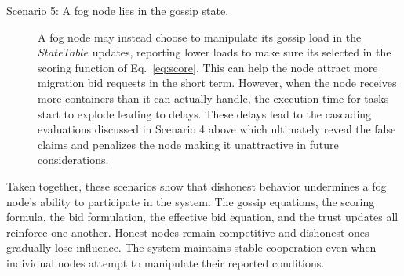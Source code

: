 \documentclass{article}
\begin{document}
\begin{description}
\item[Scenario 5: A fog node lies in the gossip state.]
A fog node may instead choose to manipulate its gossip load in the $StateTable$ updates, reporting lower loads to make sure its selected in the scoring function of Eq.~\ref{eq:score}. This can help the node attract more migration bid requests in the short term. However, when the node receives more containers than it can actually handle, the execution time for tasks start to explode leading to delays. These delays lead to the cascading evaluations discussed in Scenario 4 above which ultimately reveal the false claims and penalizes the node making it unattractive in future considerations. 





\end{description}

Taken together, these scenarios show that dishonest behavior undermines a fog node’s ability to participate in the system. The gossip equations, the scoring formula, the bid formulation, the effective bid equation, and the trust updates all reinforce one another. Honest nodes remain competitive and dishonest ones gradually lose influence. The system maintains stable cooperation even when individual nodes attempt to manipulate their reported conditions.


\clearpage


\end{document}
